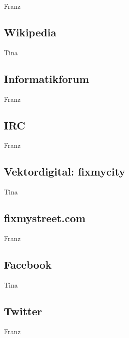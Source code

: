 Franz

\subsection{Wikipedia}

Tina

\subsection{Informatikforum}

Franz

\subsection{IRC}

Franz

\subsection{Vektordigital: fixmycity}

Tina

\subsection{fixmystreet.com}

Franz

\subsection{Facebook}

Tina

\subsection{Twitter}

Franz


